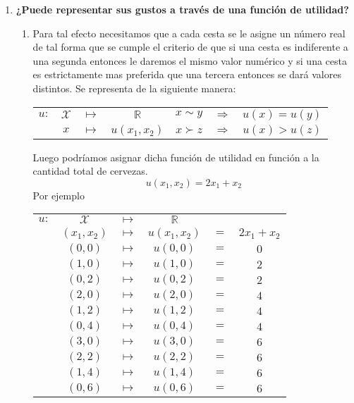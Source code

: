 \begin{enumerate}
    \item \textbf{¿Puede representar sus gustos a través de una función de utilidad?}\\

	\begin{enumerate}[\bfseries (3.1)]
	    \item Para tal efecto necesitamos que a cada cesta se le asigne un número real de tal forma que se cumple el criterio de que si una cesta es indiferente a una segunda entonces le daremos el mismo valor numérico y si una cesta es estrictamente mas preferida que una tercera entonces se dará valores distintos. Se representa de la siguiente manera:     
		\begin{center}
		    \begin{tabular}{rccc|ccc}
			$u:$&$\mathcal{X}$ & $\longmapsto$ & $\mathbb{R}$ & $x \sim y$ & $\Rightarrow$ & $u(x)=u(y)$\\
			    & $x$ & $\longmapsto$ & $u(x_1,x_2)$ & $x\succ z$&$\Rightarrow$&$u(x)>u(z)$\\
		    \end{tabular}
		\end{center}
		\vspace{.3cm}
		Luego podríamos asignar dicha función de utilidad en función a la cantidad total de cervezas. 
		$$u(x_1,x_2)=2x_1+x_2$$
		Por ejemplo

		\begin{center}
		    \begin{tabular}{cccccc}
			$u:$&$\mathcal{X}$&$\longmapsto$&$\mathbb{R}$&&\\
			 & $(x_1,x_2)$ & $\longmapsto$&$u(x_1,x_2)$&$=$&$2x_1+x_2$\\
			    & $(0,0)$ & $\longmapsto$ & $u(0,0)$ & $=$ & $0$\\
			    & $(1,0)$ & $\longmapsto$ & $u(1,0)$ & $=$ & $2$\\
			    & $(0,2)$ & $\longmapsto$ & $u(0,2)$ & $=$ & $2$\\
			    & $(2,0)$ & $\longmapsto$ & $u(2,0)$ & $=$ & $4$\\
			    & $(1,2)$ & $\longmapsto$ & $u(1,2)$ & $=$ & $4$\\
			    & $(0,4)$ & $\longmapsto$ & $u(0,4)$ & $=$ & $4$\\
			    & $(3,0)$ & $\longmapsto$ & $u(3,0)$ & $=$ & $6$\\
			    & $(2,2)$ & $\longmapsto$ & $u(2,2)$ & $=$ & $6$\\
			    & $(1,4)$ & $\longmapsto$ & $u(1,4)$ & $=$ & $6$\\
			    & $(0,6)$ & $\longmapsto$ & $u(0,6)$ & $=$ & $6$\\
		    \end{tabular}
		\end{center} 
		\vspace{.6cm}


\end{enumerate}
\end{enumerate}
